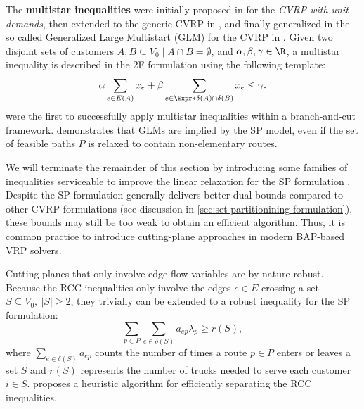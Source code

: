 The \textbf{multistar inequalities} were initially proposed in \textcite{araque1990}
for the \textit{CVRP with unit demands},
then extended to the generic CVRP in \textcite{gouveia1995, achuthan1998},
and finally generalized in the so called Generalized Large Multistart (GLM)
for the CVRP in \textcite{letchford2002,letchford2006}.
Given two disjoint sets of customers $A, B \subseteq V_0 \mid A \cap B = \emptyset$,
and $\alpha, \beta, \gamma \in \R$,
a multistar inequality is described in the 2F formulation using the following template:
\begin{equation}
	\alpha \sum_{e \in E(A)} x_e + \beta \sum_{e \in \Expr*{\delta(A) \cap \delta(B)}} x_e \le \gamma.
\end{equation}
\textcite{araqueg1994} were the first to successfully apply multistar inequalities
within a branch-and-cut framework.
\textcite{letchford2006} demonstrates that GLMs are implied by the SP model,
even if the set of feasible paths $P$ is relaxed to contain non-elementary routes.

\medskip

We will terminate the remainder of this section
by introducing some families of inequalities
serviceable to improve the linear relaxation for the SP formulation
.
Despite the SP formulation generally delivers better dual bounds
compared to other CVRP formulations (see discussion in \cref{sec:set-partitionining-formulation}),
these bounds may still be too weak to obtain an efficient algorithm.
Thus, it is common practice to introduce cutting-plane approaches
in modern BAP-based VRP solvers.

Cutting planes that only involve edge-flow variables are by nature robust.
Because the RCC inequalities only involve the edges
$e \in E$ crossing a set $S \subseteq V_0,\ |S| \ge 2$,
they trivially can be extended to a robust inequality for the SP formulation:
\begin{equation}
	\sum_{p \in P} \sum_{e \in \delta(S)}  a_{ep} \lambda_p \ge r(S),
\end{equation}
where $\sum_{e \in \delta(S)} a_{ep}$ counts the number of times a route $p \in P$
enters or leaves a set $S$
and $r(S)$ represents the number of trucks needed to serve each customer $i \in S$.
\textcite{lysgaard2003cvrpsep} proposes a heuristic algorithm
for efficiently separating the RCC inequalities.

